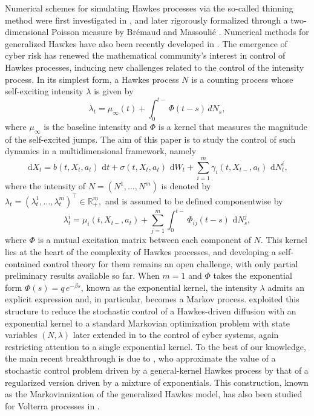 \documentclass[11pt]{article}
\theoremstyle{remarkitalic}
\theoremstyle{remarkitalic}
\newcommand{\R}{\mathbb R}
\newcommand{\dd}{\,\mathrm d}
\newcommand{\1}{\mathbf 1}
\begin{document}
Numerical schemes for simulating Hawkes processes via the so-called thinning method were first investigated in \cite{lewis1976simulation,ogata1981lewis}, and later rigorously formalized through a two-dimensional Poisson measure by Br\'emaud and Massouli\'e \cite{bremaud1996stability}. Numerical methods for generalized Hawkes have also been recently developed in \cite{zhang2009rare}. The emergence of cyber risk has renewed the mathematical community's interest in control of Hawkes processes, inducing new challenges related to the control of the intensity process. In its simplest form, a Hawkes process $N$ is a counting process whose self-exciting intensity $\lambda$ is given by
\[
    \lambda_t = \mu_\infty(t) + \int_0^{t-} \Phi(t-s)\,dN_s,
\]
where $\mu_\infty$ is the baseline intensity and $\Phi$ is a kernel that measures the magnitude of the self-excited jumps. The aim of this paper is to study the control of such dynamics in a multidimensional framework, namely
\[
    \dd X_t
    =
    b(t,X_t,a_t)\,\dd t
    +
    \sigma(t,X_t,a_t)\,\dd W_t
    +
    \sum_{i=1}^m \gamma_i(t,X_{t-},a_t)\,\dd N_t^i,
\]
where the intensity of $N = (N^1,\dots,N^m)$ is denoted by
$ \lambda_t = (\lambda_t^1,\dots,\lambda_t^m)^\top \in \R_+^m,$
and is assumed to be defined componentwise by
\[
    \lambda^i_t
    =
    \mu_i(t,X_{t-},a_t)
    +
    \sum_{j=1}^m
    \int_0^{t-}\Phi_{ij}(t-s)\,\dd N_s^j,
\]
where $\Phi$ is a mutual excitation matrix between each component of $N$.
This kernel lies at the heart of the complexity of Hawkes processes, and developing a self-contained control theory for them remains an open challenge, with only partial preliminary results available so far. When $m=1$ and $\Phi$ takes the exponential form $\Phi(s) = q\,e^{-\beta s}$, known as the exponential kernel, the intensity $\lambda$ admits an explicit expression and, in particular, becomes a Markov process. \cite{Bensoussan2024} exploited this structure to reduce the stochastic control of a Hawkes-driven diffusion with an exponential kernel to a standard Markovian optimization problem with state variables $(N,\lambda)$ later extended in \cite{callegaro2025stochastic,ongarato2026hawkes} to the control of cyber systems, again restricting attention to a single exponential kernel. To the best of our knowledge, the main recent breakthrough is due to \cite{KhabouTalbi2025}, who approximate the value of a stochastic control problem driven by a general-kernel Hawkes process by that of a regularized version driven by a mixture of exponentials. This construction, known as the Markovianization of the generalized Hawkes model, has also been studied for Volterra processes in \cite{abi2019multifactor}.
\end{document}
